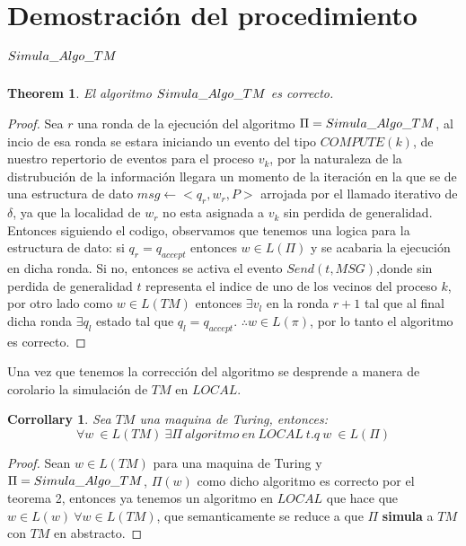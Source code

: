 \documentclass[10pt]{report}
\newtheorem{corrollary}{Corrollary}
\newtheorem{theorem}{Theorem}
\begin{document}
    \section{Demostración del procedimiento $Simula\char95Algo\char95TM$}\label{sec:demostración-del-procedimiento}
    \begin{theorem}
        El algoritmo $Simula\char95Algo\char95TM$ es correcto.
    \end{theorem}
    \begin{proof}
        Sea $r$ una ronda de la ejecución del algoritmo $\Pi=Simula\char95Algo\char95TM$,
        al incio de esa ronda se estara iniciando un evento del tipo $COMPUTE(k)$, de nuestro repertorio de eventos para el proceso
        $v_{k}$, por la naturaleza de la distrubución de la información llegara un momento
        de la iteración en la que  se de una estructura de dato $msg\gets <q_{r},w_{r},P>$ arrojada por el llamado iterativo de
        $\delta$, ya que la localidad de $w_{r}$ no esta asignada a $v_{k}$ sin perdida de generalidad.
        Entonces siguiendo el codigo, observamos que tenemos una logica para la estructura de dato:
        si $q_{r}=q_{accept}$ entonces $w\in L(\Pi)$ y se acabaria la ejecución en dicha ronda.
        Si no, entonces se activa el evento $Send(t,MSG)$,donde sin perdida de generalidad $t$ representa el indice de uno de los vecinos
        del proceso $k$, por otro lado como $w\in L(TM)$ entonces $\exists v_{l}$ en la ronda $r+1$
        tal que al final dicha ronda $\exists q_{l}$ estado tal que $q_{l} = q_{accept}$.\newline
        $\therefore w\in L(\pi)$, por lo tanto el algoritmo es correcto.

    \end{proof}
    Una vez que tenemos la corrección del algoritmo se desprende a manera de corolario la
    simulación de $TM$ en $LOCAL$.
    \begin{corrollary}
        Sea $TM$ una maquina de Turing, entonces:
        \begin{equation}
            \forall w \  \in L(TM) \ \exists \Pi \ algoritmo \ en \ LOCAL\ t.q \ w \ \in L(\Pi)
        \end{equation}
    \end{corrollary}

    \begin{proof}
        Sean $w\in L(TM)$ para una maquina de Turing y  $\Pi =Simula\char95Algo\char95TM$, $\Pi(w)$ como dicho algoritmo es correcto por el teorema 2,
        entonces ya tenemos un algoritmo  en $LOCAL$ que hace  que $w\in L(w) \ \forall w\in L(TM)$,
        que semanticamente se reduce a que $\Pi$ \textbf{simula} a $TM$ con $TM$ en abstracto.
    \end{proof}   %
\end{document}

